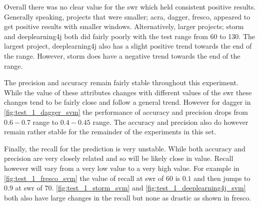 Overall there was no clear value for the \gls{swr} which held consistent positive results. Generally speaking, projects that were smaller; acra, dagger, fresco, appeared to get positive results with smaller windows. Alternatively, larger projects; storm and deeplearning4j both did fairly poorly with the test range from 60 to 130. The largest project, deeplearning4j also has a slight positive trend towards the end of the range. However, storm does have a negative trend towards the end of the range.

The precision and accuracy remain fairly stable throughout this experiment. While the value of these attributes changes with different values of the \gls{swr} these changes tend to be fairly close and follow a general trend. However for dagger in \autoref{fig:test_1_dagger_svm} the performance of accuracy and precision drops from $0.6 - 0.7$ range to $0.4 - 0.45$ range. The accuracy and precision also do however remain rather stable for the remainder of the experiments in this set.

Finally, the recall for the prediction is very unstable. While both accuracy and precision are very closely related and so will be likely close in value. Recall however will vary from a very low value to a very high value. For example in \autoref{fig:test_1_fresco_svm} the value of recall at \gls{swr} of $60$ is $0.1$ and then jumps to $0.9$ at \gls{swr} of $70$. \autoref{fig:test_1_storm_svm} and \autoref{fig:test_1_deeplearning4j_svm} both also have large changes in the recall but none as drastic as shown in fresco. 





